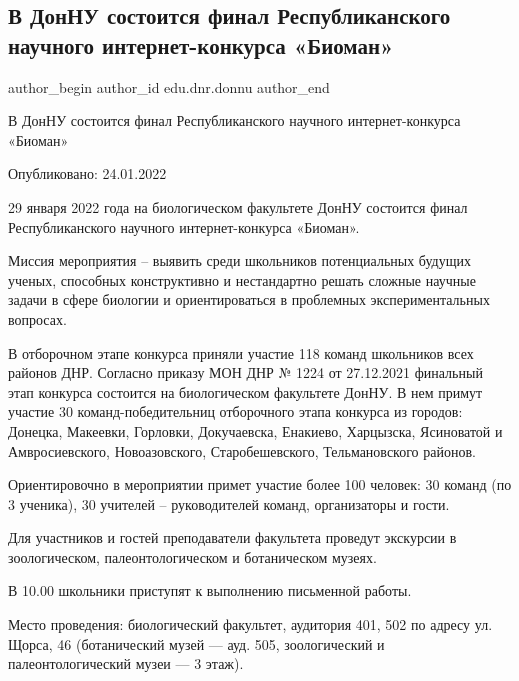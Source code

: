  
 
 
 
 
 
\subsection{В ДонНУ состоится финал Республиканского научного интернет-конкурса «Биоман»}
\label{sec:24_01_2022.stz.edu.dnr.donnu.1.konkurs_bioman}
 
\ifcmt
 author_begin
   author_id edu.dnr.donnu
 author_end
\fi

В ДонНУ состоится финал Республиканского научного интернет-конкурса «Биоман»

Опубликовано: 24.01.2022

29 января 2022 года на биологическом факультете ДонНУ состоится финал
Республиканского научного интернет-конкурса «Биоман».

Миссия мероприятия  – выявить среди школьников потенциальных будущих ученых,
способных конструктивно и нестандартно решать сложные научные задачи в сфере
биологии и ориентироваться в проблемных экспериментальных вопросах.

В отборочном этапе конкурса приняли участие 118 команд школьников всех районов
ДНР. Согласно приказу МОН ДНР № 1224 от 27.12.2021 финальный этап конкурса
состоится на биологическом факультете ДонНУ. В нем примут участие 30
команд-победительниц отборочного этапа конкурса из городов: Донецка, Макеевки,
Горловки, Докучаевска, Енакиево, Харцызска, Ясиноватой и Амвросиевского,
Новоазовского, Старобешевского, Тельмановского районов.  

Ориентировочно в мероприятии примет участие более 100 человек: 30 команд (по 3
ученика), 30 учителей – руководителей команд, организаторы и гости.

Для участников и гостей преподаватели факультета проведут экскурсии в
зоологическом,  палеонтологическом и ботаническом музеях.

В 10.00 школьники приступят к выполнению письменной работы.

Место проведения: биологический факультет, аудитория 401, 502 по адресу ул.
Щорса, 46 (ботанический музей — ауд. 505, зоологический и палеонтологический
музеи — 3 этаж). 
